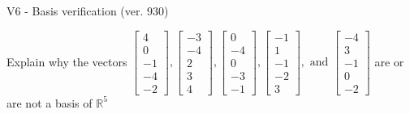 \begin{exercise}
  \begin{exerciseTitle}V6 - Basis verification (ver. 930)\end{exerciseTitle}
  \begin{exerciseStatement}
    Explain why the vectors \(\left[\begin{array}{r}
4 \\
0 \\
-1 \\
-4 \\
-2
\end{array}\right] , \left[\begin{array}{r}
-3 \\
-4 \\
2 \\
3 \\
4
\end{array}\right] , \left[\begin{array}{r}
0 \\
-4 \\
0 \\
-3 \\
-1
\end{array}\right] , \left[\begin{array}{r}
-1 \\
1 \\
-1 \\
-2 \\
3
\end{array}\right] , \text{ and } \left[\begin{array}{r}
-4 \\
3 \\
-1 \\
0 \\
-2
\end{array}\right]\) are or are not a basis of \(\mathbb{R}^5\)	



\end{exerciseStatement}
\end{exercise}

